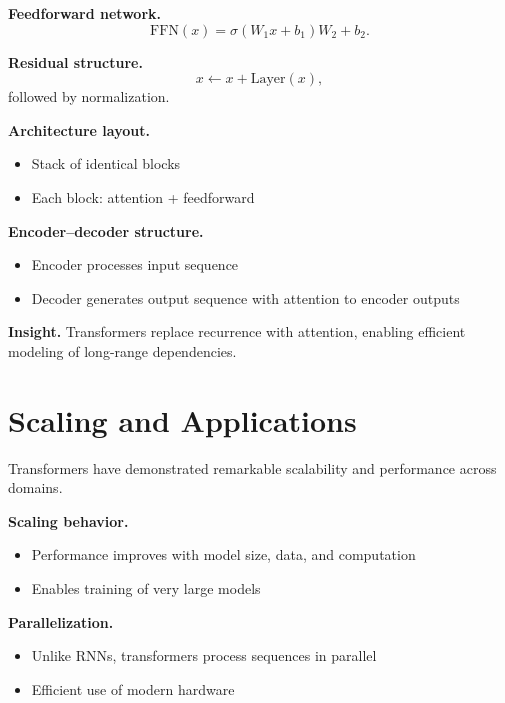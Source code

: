 \medskip

\noindent
\textbf{Feedforward network.}
\[
\mathrm{FFN}(x) = \sigma(W_1 x + b_1) W_2 + b_2.
\]

\medskip

\noindent
\textbf{Residual structure.}
\[
x \leftarrow x + \mathrm{Layer}(x),
\]
followed by normalization.

\medskip

\noindent
\textbf{Architecture layout.}
\begin{itemize}
    \item Stack of identical blocks
    \item Each block: attention + feedforward
\end{itemize}

\medskip

\noindent
\textbf{Encoder--decoder structure.}
\begin{itemize}
    \item Encoder processes input sequence
    \item Decoder generates output sequence with attention to encoder outputs
\end{itemize}

\medskip

\noindent
\textbf{Insight.}  
Transformers replace recurrence with attention, enabling efficient modeling of long-range dependencies.

\section{Scaling and Applications}

Transformers have demonstrated remarkable scalability and performance across domains.

\medskip

\noindent
\textbf{Scaling behavior.}
\begin{itemize}
    \item Performance improves with model size, data, and computation
    \item Enables training of very large models
\end{itemize}

\medskip

\noindent
\textbf{Parallelization.}
\begin{itemize}
    \item Unlike RNNs, transformers process sequences in parallel
    \item Efficient use of modern hardware
\end{itemize}

